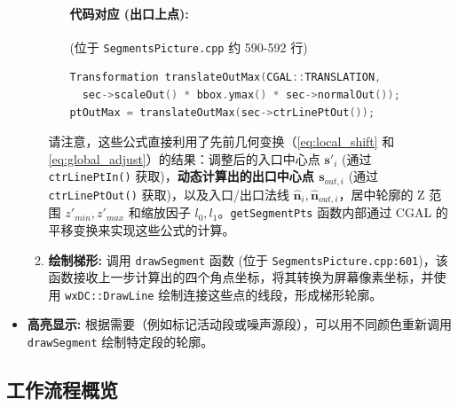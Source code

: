 \documentclass{ctexart}
\begin{document}
\begin{itemize}
\begin{enumerate}
\begin{itemize}
                    \paragraph{代码对应 (出口上点):} (位于 \texttt{SegmentsPicture.cpp} 约 590-592 行)
                    \begin{lstlisting}[language=C++]
Transformation translateOutMax(CGAL::TRANSLATION,
  sec->scaleOut() * bbox.ymax() * sec->normalOut());
ptOutMax = translateOutMax(sec->ctrLinePtOut());
                    \end{lstlisting}
                \end{itemize}
                请注意，这些公式直接利用了先前几何变换（\eqref{eq:local_shift} 和 \eqref{eq:global_adjust}）的结果：调整后的入口中心点 \({\mathbf{s}'}_i\) (通过 \texttt{ctrLinePtIn()} 获取)，\textbf{动态计算出的出口中心点 \(\mathbf{s}_{out,i}\)} (通过 \texttt{ctrLinePtOut()} 获取)，以及入口/出口法线 \(\hat{\mathbf{n}}_i, \hat{\mathbf{n}}_{out,i}\)，居中轮廓的 Z 范围 \(z'_{min}, z'_{max}\) 和缩放因子 \(l_0, l_1\)。\texttt{getSegmentPts} 函数内部通过 CGAL 的平移变换来实现这些公式的计算。
            \item \textbf{绘制梯形:} 调用 \texttt{drawSegment} 函数 (位于 \texttt{SegmentsPicture.cpp:601})，该函数接收上一步计算出的四个角点坐标，将其转换为屏幕像素坐标，并使用 \texttt{wxDC::DrawLine} 绘制连接这些点的线段，形成梯形轮廓。
        \end{enumerate}
     \item \textbf{高亮显示:} 根据需要（例如标记活动段或噪声源段），可以用不同颜色重新调用 \texttt{drawSegment} 绘制特定段的轮廓。
\end{itemize}

\subsection{工作流程概览}
\end{document}
